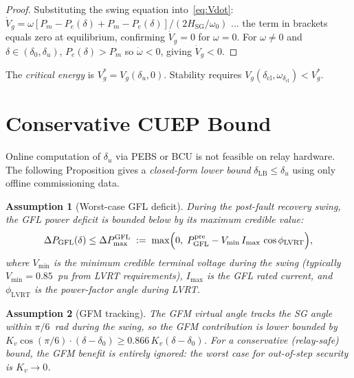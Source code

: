 \documentclass[11pt,a4paper]{article}
\newtheorem{assumption}{Assumption}
\newcommand{\dz}{\delta_0}         %
\newcommand{\du}{\delta_u}         %
\newcommand{\dlb}{\delta_{\mathrm{LB}}}   %
\newcommand{\dcl}{\delta_{\mathrm{cl}}}   %
\newcommand{\Pm}{P_m}
\newcommand{\Kv}{K_v}
\newcommand{\Hsg}{H_{\mathrm{SG}}}
\newcommand{\omegaz}{\omega_0}
\begin{document}
\begin{proof}
Substituting the swing equation into~\eqref{eq:Vdot}:
$\dot{V}_g = \omega[P_m - P_e(\delta) + P_m - P_e(\delta)]/(2\Hsg/\omegaz)$
... the term in brackets equals zero at equilibrium, confirming $\dot{V}_g=0$
for $\omega=0$.  For $\omega \neq 0$ and $\delta \in (\dz, \du)$,
$P_e(\delta) > \Pm$ so $\dot\omega < 0$, giving $\dot{V}_g < 0$.
\end{proof}

The \emph{critical energy} is $V_g^* = V_g(\du, 0)$.
Stability requires $V_g(\dcl, \omega_{\dcl}) < V_g^*$.

\section{Conservative CUEP Bound}
\label{sec:prop}

Online computation of $\du$ via PEBS or BCU is not feasible on relay
hardware.  The following Proposition gives a \emph{closed-form lower bound}
$\dlb \leq \du$ using only offline commissioning data.

\begin{assumption}[Worst-case GFL deficit]
\label{ass:gfl}
During the post-fault recovery swing, the GFL power deficit is bounded below
by its maximum credible value:
\begin{equation}
  \Delta P_{\mathrm{GFL}}(\delta) \leq \Delta P_{\max}^{\mathrm{GFL}}
  \;:=\; \max\Bigl(0,\;
    P_{\mathrm{GFL}}^{\mathrm{pre}} - V_{\min}\,I_{\max}\,\cos\phi_{\mathrm{LVRT}}
  \Bigr),
  \label{eq:DPmax}
\end{equation}
where $V_{\min}$ is the minimum credible terminal voltage during the swing
(typically $V_{\min} = 0.85$~pu from LVRT requirements),
$I_{\max}$ is the GFL rated current, and $\phi_{\mathrm{LVRT}}$ is the
power-factor angle during LVRT.
\end{assumption}

\begin{assumption}[GFM tracking]
\label{ass:gfm}
The GFM virtual angle tracks the SG angle within $\pi/6$~rad during the
swing, so the GFM contribution is lower bounded by
$\Kv\cos(\pi/6)\cdot(\delta-\dz) \geq 0.866\,\Kv(\delta-\dz)$.
For a conservative (relay-safe) bound, the GFM benefit is entirely ignored:
the worst case for out-of-step \emph{security} is $\Kv \to 0$.
\end{assumption}
\end{document}
